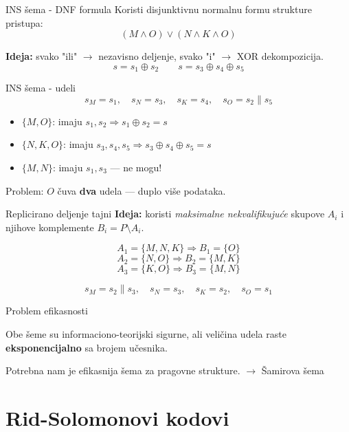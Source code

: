 \documentclass[aspectratio=1610]{beamer}
\begin{document}
 

\begin{frame}{INS šema - DNF formula}
Koristi disjunktivnu normalnu formu strukture pristupa:
\[(M \wedge O) \vee (N \wedge K \wedge O)\]
 
\textbf{Ideja:} svako "ili" $\to$ nezavisno deljenje, svako "i" $\to$ XOR dekompozicija.
\[s = s_1 \oplus s_2 \qquad s = s_3 \oplus s_4 \oplus s_5\]
\end{frame}
 
\begin{frame}{INS šema - udeli}
\[s_M = s_1, \quad s_N = s_3, \quad s_K = s_4, \quad s_O = s_2 \| s_5\]
 
\begin{itemize}
\item $\{M, O\}$: imaju $s_1, s_2 \Rightarrow s_1 \oplus s_2 = s$ \checkmark
\item $\{N,K,O\}$: imaju $s_3,s_4,s_5 \Rightarrow s_3 \oplus s_4 \oplus s_5 = s$ \checkmark
\item $\{M, N\}$: imaju $s_1, s_3$ --- ne mogu! \checkmark
\end{itemize}
 
\vspace{1em}
\alert{Problem:} $O$ čuva \textbf{dva} udela --- duplo više podataka.
\end{frame}



\begin{frame}{Replicirano deljenje tajni}
\textbf{Ideja:} koristi \emph{maksimalne nekvalifikujuće} skupove $A_i$ i njihove komplemente $B_i = P \setminus A_i$.
 
\[A_1 = \{M,N,K\} \Rightarrow B_1 = \{O\}\]
\[A_2 = \{N,O\} \Rightarrow B_2 = \{M,K\}\]
\[A_3 = \{K,O\} \Rightarrow B_3 = \{M,N\}\]
 
\[s_M = s_2 \| s_3, \quad s_N = s_3, \quad s_K = s_2, \quad s_O = s_1\]
\end{frame}
 

\begin{frame}{Problem efikasnosti}
 
\vspace{1em}
Obe šeme su informaciono-teorijski sigurne, ali veličina udela
raste \textbf{eksponencijalno} sa brojem učesnika.
 
\vspace{0.8em}
\alert{Potrebna nam je efikasnija šema za pragovne strukture.}
$\to$ Šamirova šema
\end{frame}


\section{Rid-Solomonovi kodovi}
 
\end{document}
